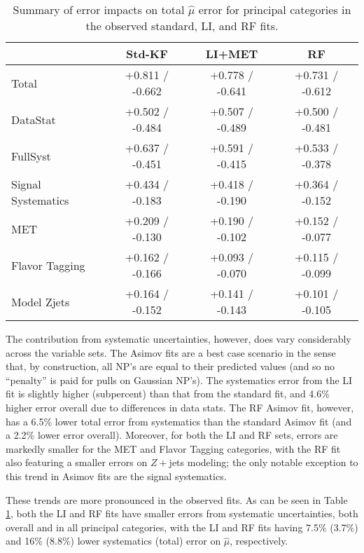 \begin{table}[!htbp]\captionsetup{justification=centering}
\begin{center}
\begin{tabular}{lccc}
\hline\hline
 &Std-KF &LI+MET &RF\\
\hline
Total &  +0.811 / -0.662  &  +0.778 / -0.641  &  +0.731 / -0.612 \\
\hline
DataStat &  +0.502 / -0.484  &  +0.507 / -0.489  &  +0.500 / -0.481 \\
\hline
FullSyst &  +0.637 / -0.451  &  +0.591 / -0.415  &  +0.533 / -0.378 \\
\hline
Signal Systematics &  +0.434 / -0.183  &  +0.418 / -0.190  &  +0.364 / -0.152 \\
\hline
MET &  +0.209 / -0.130  &  +0.190 / -0.102  &  +0.152 / -0.077 \\
\hline
Flavor Tagging &  +0.162 / -0.166  &  +0.093 / -0.070  &  +0.115 / -0.099 \\
\hline
Model Zjets &  +0.164 / -0.152  &  +0.141 / -0.143  &  +0.101 / -0.105 \\
\hline
\end{tabular}
\caption{Summary of error impacts on total $\hat{\mu}$ error for principal categories in the observed standard, LI, and RF fits.}
\label{tab:bd-obs-summary}
\end{center}
\end{table}


The contribution from systematic uncertainties, however, does vary considerably across the variable sets.  The Asimov fits are a best case scenario in the sense that, by construction, all NP's are equal to their predicted values (and so no ``penalty'' is paid for pulls on Gaussian NP's).  The systematics error from the LI fit is slightly higher (subpercent) than that from the standard fit, and 4.6\% higher error overall due to differences in data stats.  The RF Asimov fit, however, has a 6.5\% lower total error from systematics than the standard Asimov fit (and a 2.2\% lower error overall).  Moreover, for both the LI and RF sets, errors are markedly smaller for the MET and Flavor Tagging categories, with the RF fit also featuring a smaller errors on $Z+$jets modeling; the only notable exception to this trend in Asimov fits are the signal systematics.

These trends are more pronounced in the observed fits.  As can be seen in Table \ref{tab:bd-obs-summary}, both the LI and RF fits have smaller errors from systematic uncertainties, both overall and in all principal categories, with the LI and RF fits having 7.5\% (3.7\%) and 16\% (8.8\%) lower systematics (total) error on $\hat{\mu}$, respectively.

